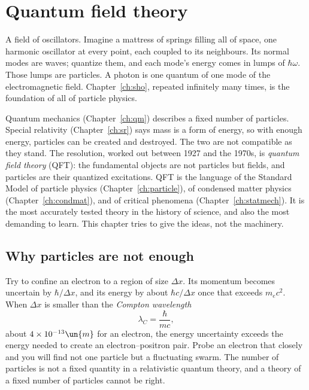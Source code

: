 \chapter{Quantum field theory}
\label{ch:qft}



\begin{prototype}
A field of oscillators. Imagine a mattress of springs filling all of space, one harmonic oscillator at every point, each coupled to its neighbours. Its normal modes are waves; quantize them, and each mode's energy comes in lumps of $\hbar\omega$. Those lumps are particles. A photon is one quantum of one mode of the electromagnetic field. Chapter~\ref{ch:sho}, repeated infinitely many times, is the foundation of all of particle physics.
\end{prototype}

Quantum mechanics (Chapter~\ref{ch:qm}) describes a fixed number of particles. Special relativity (Chapter~\ref{ch:sr}) says mass is a form of energy, so with enough energy, particles can be created and destroyed. The two are not compatible as they stand. The resolution, worked out between 1927 and the 1970s, is \emph{quantum field theory} (QFT): the fundamental objects are not particles but fields, and particles are their quantized excitations. QFT is the language of the Standard Model of particle physics (Chapter~\ref{ch:particle}), of condensed matter physics (Chapter~\ref{ch:condmat}), and of critical phenomena (Chapter~\ref{ch:statmech}). It is the most accurately tested theory in the history of science, and also the most demanding to learn. This chapter tries to give the ideas, not the machinery.

\section{Why particles are not enough}

Try to confine an electron to a region of size $\Delta x$. Its momentum becomes uncertain by $\hbar/\Delta x$, and its energy by about $\hbar c/\Delta x$ once that exceeds $m_ec^2$. When $\Delta x$ is smaller than the \emph{Compton wavelength}
\[
  \lambda_C = \frac{\hbar}{mc},
\]
about $4\times10^{-13}\un{m}$ for an electron, the energy uncertainty exceeds the energy needed to create an electron--positron pair. Probe an electron that closely and you will find not one particle but a fluctuating swarm. The number of particles is not a fixed quantity in a relativistic quantum theory, and a theory of a fixed number of particles cannot be right.

